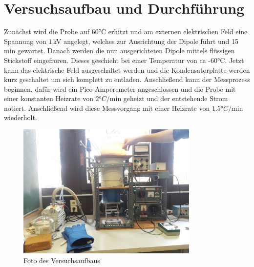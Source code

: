 \section{Versuchsaufbau und Durchführung}
\label{sec:Versuchaufbau}

Zunächst wird die Probe auf 60°C erhitzt und am externen elektrischen Feld
eine Spannung von $1\,$kV angelegt, welches zur Ausrichtung der Dipole
führt und 15 min gewartet. Danach werden die nun ausgerichteten Dipole
mittels flüssigen Stickstoff eingefroren. Dieses geschieht
bei einer Temperatur von ca -60°C. Jetzt kann das elektrische Feld
ausgeschaltet werden und die Kondensatorplatte werden kurz geschaltet um
sich komplett zu entladen. Anschließend kann der Messprozess beginnen,
dafür wird ein Pico-Amperemeter angeschlossen und die Probe mit einer
konstanten Heizrate von $2°C/$min geheizt und der entstehende Strom notiert.
Anschließend wird diese Messvorgang mit einer Heizrate von $1.5°C/$min
wiederholt.
\begin{figure}
\centering
\includegraphics[width=0.8\textwidth]{ressources/photo5458414829602712357.jpg}
\caption{Foto des Versuchsaufbaus}
\label{aufbau}
\end{figure}

